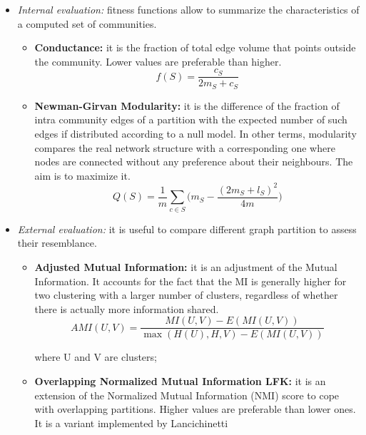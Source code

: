 \documentclass[sigchi]{acmart}
\begin{document}
\begin{itemize}
    \item \textit{Internal evaluation:} fitness functions allow to summarize the characteristics of a computed set of communities.
    \begin{itemize}
        \item \textbf{Conductance:} it is the fraction of total edge volume that points outside the community. Lower values are preferable than higher.
        \begin{equation}
            f(S)=\frac{c_S}{2m_S+c_S}
        \end{equation}
        \item \textbf{Newman-Girvan Modularity:}\cite{ngmod} it is the difference of the fraction of intra community edges of a partition with the expected number of such edges if distributed according to a null model.  In other terms, modularity compares the real network structure with a corresponding one where nodes are connected without any preference about their neighbours. The aim is to maximize it. 
        \begin{equation}
            Q(S)=\frac{1}{m}\sum_{c \in S}\biggl(m_S-\frac{(2m_S+l_S)^2}{4m}\biggr)
        \end{equation}
    \end{itemize}
 
    \item \textit{External evaluation:} it is useful to compare different graph partition to assess their resemblance.
    \begin{itemize}
        \item \textbf{Adjusted Mutual Information:} it is an adjustment of the Mutual Information. It accounts for the fact that the MI is generally higher for two clustering with a larger number of clusters, regardless of whether there is actually more information shared.
        \begin{equation}
            AMI(U,V)=\frac{MI(U,V)-E(MI(U,V))}{\max(H(U),H,V)-E(MI(U,V))}
        \end{equation}
 
        where U and V are clusters;
        \item \textbf{Overlapping Normalized Mutual Information LFK:} it is an extension of the Normalized Mutual Information (NMI) score to cope with overlapping partitions. Higher values are preferable than lower ones. It is a variant implemented by Lancichinetti \cite{Lancichinetti_2009}


\end{itemize}
\end{itemize}
\end{document}
